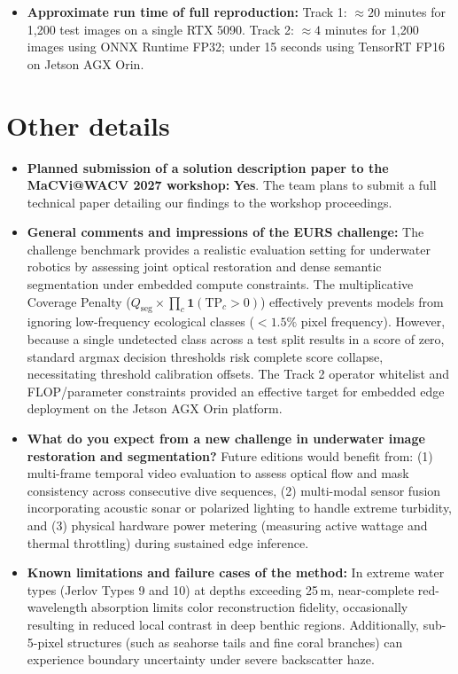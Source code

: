 \documentclass{article}
\begin{document}
\begin{itemize}[leftmargin=*]
\begin{itemize}
    \item Track 2: Composite score $\approx \mathbf{0.407}$ ($Q_{\text{seg}} \approx 0.227$, mIoU $\approx 0.406$, Macro $F_1 \approx 0.560$, PSNR $\approx 23.25$\,dB, SSIM $\approx 0.847$, Complexity $\approx 9.82$\,GFLOPs, 0.884\,M params).
  \end{itemize}
\item \textbf{Approximate run time of full reproduction:}
  Track 1: $\approx 20$ minutes for 1,200 test images on a single RTX 5090. Track 2: $\approx 4$ minutes for 1,200 images using ONNX Runtime FP32; under 15 seconds using TensorRT FP16 on Jetson AGX Orin.
\end{itemize}

\section{Other details}

\begin{itemize}[leftmargin=*]
\item \textbf{Planned submission of a solution description paper to the MaCVi@WACV 2027 workshop:} \textbf{Yes}. The team plans to submit a full technical paper detailing our findings to the workshop proceedings.
\item \textbf{General comments and impressions of the EURS challenge:}
  The challenge benchmark provides a realistic evaluation setting for underwater robotics by assessing joint optical restoration and dense semantic segmentation under embedded compute constraints. The multiplicative Coverage Penalty ($Q_{\text{seg}} \times \prod_c \mathbf{1}(\text{TP}_c > 0)$) effectively prevents models from ignoring low-frequency ecological classes ($<1.5\%$ pixel frequency). However, because a single undetected class across a test split results in a score of zero, standard argmax decision thresholds risk complete score collapse, necessitating threshold calibration offsets. The Track 2 operator whitelist and FLOP/parameter constraints provided an effective target for embedded edge deployment on the Jetson AGX Orin platform.
\item \textbf{What do you expect from a new challenge in underwater image restoration and segmentation?}
  Future editions would benefit from: (1) multi-frame temporal video evaluation to assess optical flow and mask consistency across consecutive dive sequences, (2) multi-modal sensor fusion incorporating acoustic sonar or polarized lighting to handle extreme turbidity, and (3) physical hardware power metering (measuring active wattage and thermal throttling) during sustained edge inference.
\item \textbf{Known limitations and failure cases of the method:}
  In extreme water types (Jerlov Types 9 and 10) at depths exceeding 25\,m, near-complete red-wavelength absorption limits color reconstruction fidelity, occasionally resulting in reduced local contrast in deep benthic regions. Additionally, sub-5-pixel structures (such as seahorse tails and fine coral branches) can experience boundary uncertainty under severe backscatter haze.
\end{itemize}
\end{document}
